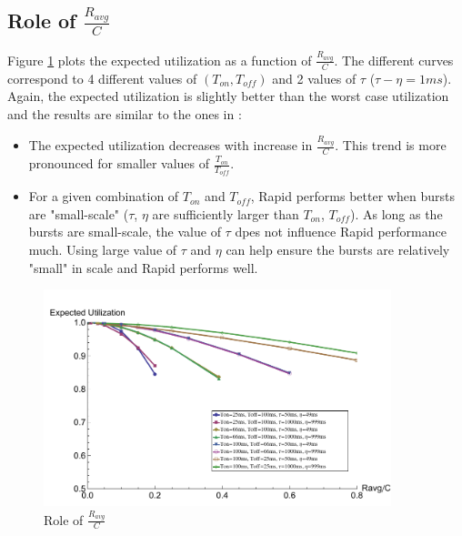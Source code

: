   \subsection{Role of $\frac{R_{avg}}{C}$}
    Figure \ref{rttravgc} plots the expected utilization as a function of 
    $\frac{R_{avg}}{C}$. The different curves correspond to 4 different 
    values of $(T_{on}, T_{off})$ and 2 values of 
    $\tau$ ($\tau - \eta = 1ms$). Again, the expected utilization is slightly 
    better than the worst case utilization and the results are similar to the 
    ones in \cite{Lovewell2011-Noise-TR}:
    \begin{itemize}
      \item The expected utilization decreases with increase in 
      $\frac{R_{avg}}{C}$. This trend is more pronounced for smaller values of 
      $\frac{T_{on}}{T_{off}}$.
      \item For a given combination of $T_{on}$ and $T_{off}$, Rapid performs 
      better when bursts are "small-scale" ($\tau$, $\eta$ are sufficiently 
      larger than $T_{on}$, $T_{off}$). As long as the bursts are 
      small-scale, the value of $\tau$ dpes not influence Rapid performance 
      much. Using large value of $\tau$ and $\eta$ can help ensure the 
      bursts are relatively "small" in scale and Rapid performs well.
    \end{itemize}
    \begin{figure}[h]
      \centering
      \includegraphics[width=0.9\textwidth]{img/rttravgc.pdf}
      \caption{Role of $\frac{R_{avg}}{C}$}
      \label{rttravgc}
    \end{figure}

